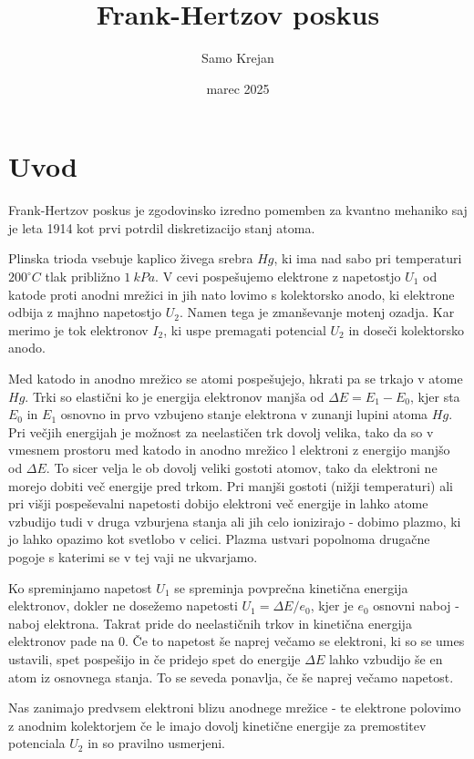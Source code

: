 \documentclass[10pt]{article}
\title{Frank-Hertzov poskus}
\author{Samo Krejan}
\date{marec 2025}
\begin{document}
\maketitle

\section*{Uvod}

Frank-Hertzov poskus je zgodovinsko izredno pomemben za kvantno mehaniko saj je leta 1914 kot prvi potrdil diskretizacijo stanj atoma.

Plinska trioda vsebuje kaplico živega srebra $Hg$, ki ima nad sabo pri temperaturi $200^{\circ}C$ tlak približno $1 \ kPa$. V cevi pospešujemo elektrone z napetostjo $U_1$ od katode proti anodni mrežici in jih nato lovimo s kolektorsko anodo, ki elektrone odbija z majhno napetostjo $U_2$. Namen tega je zmanševanje motenj ozadja. Kar merimo je tok elektronov $I_2$, ki uspe premagati potencial $U_2$ in doseči kolektorsko anodo.

Med katodo in anodno mrežico se atomi pospešujejo, hkrati pa se trkajo v atome $Hg$. Trki so elastični ko je energija elektronov manjša od $\Delta E = E_1 - E_0$, kjer sta $E_0$ in $E_1$ osnovno in prvo vzbujeno stanje elektrona v zunanji lupini atoma $Hg$. Pri večjih energijah je možnost za neelastičen trk dovolj velika, tako da so v vmesnem prostoru med katodo in anodno mrežico l elektroni z energijo manjšo od $\Delta E$. To sicer velja le ob dovolj veliki gostoti atomov, tako da elektroni ne morejo dobiti več energije pred trkom. Pri manjši gostoti (nižji temperaturi) ali pri višji pospeševalni napetosti dobijo elektroni več energije in lahko atome vzbudijo tudi v druga vzburjena stanja ali jih celo ionizirajo - dobimo plazmo, ki jo lahko opazimo kot svetlobo v celici. Plazma ustvari popolnoma drugačne pogoje s katerimi se v tej vaji ne ukvarjamo.

Ko spreminjamo napetost $U_1$ se spreminja povprečna kinetična energija elektronov, dokler ne dosežemo napetosti $U_1 = \Delta E / e_0$, kjer je $e_0$ osnovni naboj - naboj elektrona. Takrat pride do neelastičnih trkov in kinetična energija elektronov pade na $0$. Če to napetost še naprej večamo se elektroni, ki so se umes ustavili, spet pospešijo in če pridejo spet do energije $\Delta E$ lahko vzbudijo še en atom iz osnovnega stanja. To se seveda ponavlja, če še naprej večamo napetost.

Nas zanimajo predvsem elektroni blizu anodnege mrežice - te elektrone polovimo z anodnim kolektorjem če le imajo dovolj kinetične energije za premostitev potenciala $U_2$ in so pravilno usmerjeni.
\end{document}

